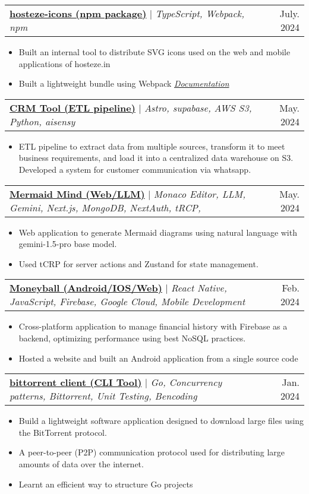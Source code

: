 \documentclass[a4paper,11pt]{article}
\makeatletter
\newcommand{\resumeItem}[1]{
  \item\small{
    {#1 \vspace{-2pt}}
  }
}
\newcommand{\resumeProjectHeading}[2]{
    \item
    \begin{tabular*}{0.97\textwidth}{l@{\extracolsep{\fill}}r}
      \small#1 & #2 \\
    \end{tabular*}\vspace{-7pt}
}
\newcommand{\resumeItemListStart}{\begin{itemize}}
\newcommand{\resumeItemListEnd}{\end{itemize}\vspace{-5pt}}
\makeatother
\begin{document}
\resumeProjectHeading
{\href{https://www.npmjs.com/package/hosteze-icons}{\textbf{hosteze-icons (npm package)}} $|$ \footnotesize\emph{TypeScript, Webpack, npm}}{July. 2024}
\resumeItemListStart
    \resumeItem{Built an internal tool to distribute SVG icons used on the web and mobile applications of hosteze.in}
    \resumeItem{Built a lightweight bundle using Webpack \hfill \href{https://adimail.github.io/hosteze-icons/}{\textit{Documentation} \footnotesize{\faIcon{globe}}}}
\resumeItemListEnd

\resumeProjectHeading
{\href{https://adimail.github.io/posts/telegram-scrapping/}{\textbf{CRM Tool (ETL pipeline)}} $|$ \footnotesize\emph{Astro, supabase, AWS S3, Python, aisensy}}{May. 2024}
\resumeItemListStart
    \resumeItem{ETL pipeline to extract data from multiple sources, transform it to meet business requirements, and load it into a centralized data warehouse on S3. Developed a system for customer communication via whatsapp.}
\resumeItemListEnd

\resumeProjectHeading
{\href{https://mermaid-mind.vercel.app/}{\textbf{Mermaid Mind (Web/LLM)}} $|$ \footnotesize\emph{Monaco Editor, LLM, Gemini, Next.js, MongoDB, NextAuth, tRCP, }}{May. 2024}
\resumeItemListStart
    \resumeItem{Web application to generate Mermaid diagrams using natural language with gemini-1.5-pro base model.}
    \resumeItem{Used tCRP for server actions and Zustand for state management.}
\resumeItemListEnd

\resumeProjectHeading
{\href{https://github.com/adimail/moneyball-native}{\textbf{Moneyball (Android/IOS/Web)}} $|$ \footnotesize\emph{React Native, JavaScript, Firebase, Google Cloud, Mobile Development}}{Feb. 2024}
\resumeItemListStart
    \resumeItem{Cross-platform application to manage financial history with Firebase as a backend, optimizing performance using best NoSQL practices.}
    \resumeItem{Hosted a website and built an Android application from a single source code}
\resumeItemListEnd

\resumeProjectHeading
{\href{https://github.com/adimail/torrent-client}{\textbf{bittorrent client (CLI Tool)}} $|$ \footnotesize\emph{Go, Concurrency patterns, Bittorrent, Unit Testing, Bencoding}}{Jan. 2024}
\resumeItemListStart
    \resumeItem{Build a lightweight software application designed to download large files using the BitTorrent protocol.}
    \resumeItem{A peer-to-peer (P2P) communication protocol used for distributing large amounts of data over the internet.}
    \resumeItem{Learnt an efficient way to structure Go projects}
\resumeItemListEnd
\end{document}
